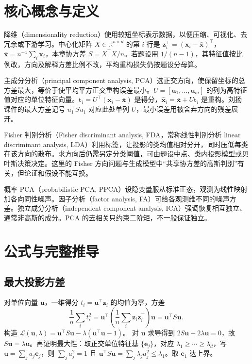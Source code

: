 \documentclass[UTF8,a4paper,zihao=-4,fontset=fandol]{ctexrep}
\begin{document}
\section{核心概念与定义}
\begin{description}[leftmargin=2em,style=nextline]
\item[降维与中心化] 降维（dimensionality reduction）使用较短坐标表示数据，以便压缩、可视化、去冗余或下游学习。中心化矩阵 \(X\in\mathbb R^{n\times d}\) 的第 \(i\) 行是 \(\bm z_i^\top=(\bm x_i-\bar{\bm x})^\top\)，\(\bar{\bm x}=n^{-1}\sum_i\bm x_i\)，本章协方差 \(S=X^\top X/n\)。若题设用 \(1/(n-1)\)，其特征值按比例改，方向及解释方差比例不改，平均重构损失仍按题设分母算。
\item[主成分] 主成分分析（principal component analysis, PCA）选正交方向，使保留坐标的总方差最大，等价于使平均平方正交重构误差最小。\(U=[\bm u_1,\ldots,\bm u_m]\) 的列为高特征值对应的单位特征向量。\(\bm t_i=U^\top(\bm x_i-\bar{\bm x})\) 是得分，\(\hat{\bm x}_i=\bar{\bm x}+U\bm t_i\) 是重构。刘扬课件的最大方差记号 \(u_1^\top S u_1\) 对应此处单列 \(U\)，最小误差用被舍弃方向的残差展开。
\item[Fisher 判别] Fisher 判别分析（Fisher discriminant analysis, FDA，常称线性判别分析 linear discriminant analysis, LDA）利用标签，让投影的类均值相对分开，同时压低每类在该方向的散布。求方向后仍需另定分类阈值，可由题设中点、类内投影模型或贝叶斯决策决定。这里的 Fisher 方向问题与生成模型中“共享协方差的高斯判别”有关，但论证和假设不能互换。
\item[随机潜变量] 概率 PCA（probabilistic PCA, PPCA）设隐变量服从标准正态，观测为线性映射加各向同性噪声。因子分析（factor analysis, FA）可给各观测维不同的噪声方差。独立成分分析（independent component analysis, ICA）强调恢复相互独立、通常非高斯的成分。PCA 的去相关只约束二阶矩，不一般保证独立。
\end{description}

\section{公式与完整推导}
\subsection*{最大投影方差}
对单位向量 \(\bm u\)，一维得分 \(t_i=\bm u^\top\bm z_i\) 的均值为零，方差
\[
 \frac1n\sum_i t_i^2=\bm u^\top
 \left(\frac1n\sum_i\bm z_i\bm z_i^\top\right)\bm u
 =\bm u^\top S\bm u .
\]
构造 \(\mathcal L(\bm u,\lambda)=\bm u^\top S\bm u-\lambda(\bm u^\top\bm u-1)\)。
对 \(\bm u\) 求导得到 \(2S\bm u-2\lambda\bm u=0\)，故 \(S\bm u=\lambda\bm u\)。再证明最大性：取正交单位特征基 \(\{\bm e_j\}\)，对应 \(\lambda_1\ge\cdots\ge\lambda_d\)，写 \(\bm u=\sum_j a_j\bm e_j\)，则 \(\sum_j a_j^2=1\) 且 \(\bm u^\top S\bm u=\sum_j\lambda_j a_j^2\le\lambda_1\)。取 \(\bm e_1\) 达上界。
\end{document}
